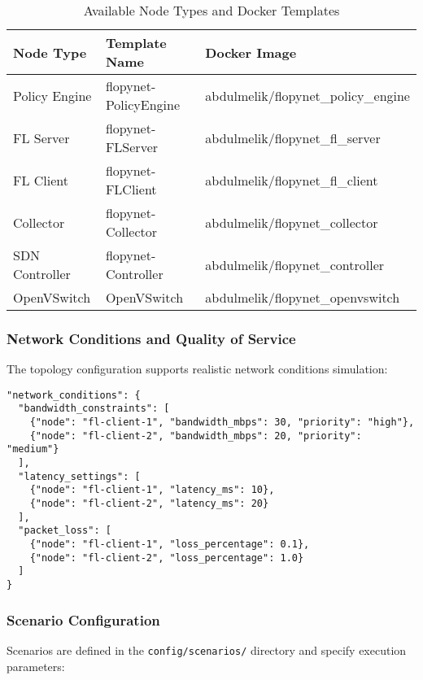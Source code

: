 \begin{table}[H]
\centering
\caption{Available Node Types and Docker Templates}
\label{tab:node-types}
\begin{tabular}{@{}lll@{}}
\toprule
\textbf{Node Type} & \textbf{Template Name} & \textbf{Docker Image} \\
\midrule
Policy Engine & flopynet-PolicyEngine & abdulmelik/flopynet\_policy\_engine \\
FL Server & flopynet-FLServer & abdulmelik/flopynet\_fl\_server \\
FL Client & flopynet-FLClient & abdulmelik/flopynet\_fl\_client \\
Collector & flopynet-Collector & abdulmelik/flopynet\_collector \\
SDN Controller & flopynet-Controller & abdulmelik/flopynet\_controller \\
OpenVSwitch & OpenVSwitch & abdulmelik/flopynet\_openvswitch \\
\bottomrule
\end{tabular}
\end{table}

\subsubsection{Network Conditions and Quality of Service}

The topology configuration supports realistic network conditions simulation:

\begin{lstlisting}[style=jsoncode, caption=Network Conditions Configuration]
"network_conditions": {
  "bandwidth_constraints": [
    {"node": "fl-client-1", "bandwidth_mbps": 30, "priority": "high"},
    {"node": "fl-client-2", "bandwidth_mbps": 20, "priority": "medium"}
  ],
  "latency_settings": [
    {"node": "fl-client-1", "latency_ms": 10},
    {"node": "fl-client-2", "latency_ms": 20}
  ],
  "packet_loss": [
    {"node": "fl-client-1", "loss_percentage": 0.1},
    {"node": "fl-client-2", "loss_percentage": 1.0}
  ]
}
\end{lstlisting}

\subsubsection{Scenario Configuration}

Scenarios are defined in the \texttt{config/scenarios/} directory and specify execution parameters:

